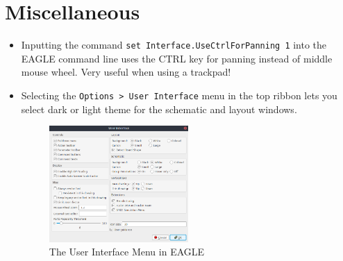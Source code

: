 \documentclass{article}
\begin{document}
\section{Miscellaneous}
\begin{itemize}
    \item Inputting the command \texttt{set Interface.UseCtrlForPanning 1} into the EAGLE command line uses the CTRL key for panning instead of middle mouse wheel. 
        Very useful when using a trackpad!
    \item Selecting the \texttt{Options > User Interface} menu in the top ribbon lets you select dark or light theme for the schematic and layout windows. 
        \\
    \begin{figure}[h!]
        \centering
        \includegraphics[width=0.5\textwidth]{UserInterfaceMenu.png}
        \caption{The User Interface Menu in EAGLE}
    \end{figure}
\end{itemize}
\end{document}
